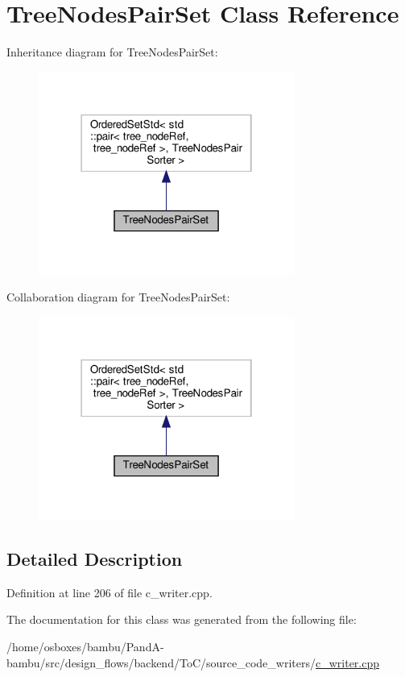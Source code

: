 \hypertarget{classTreeNodesPairSet}{}\section{Tree\+Nodes\+Pair\+Set Class Reference}
\label{classTreeNodesPairSet}


Inheritance diagram for Tree\+Nodes\+Pair\+Set\+:
\nopagebreak
\begin{figure}[H]
\begin{center}
\leavevmode
\includegraphics[width=238pt]{d7/df7/classTreeNodesPairSet__inherit__graph}
\end{center}
\end{figure}


Collaboration diagram for Tree\+Nodes\+Pair\+Set\+:
\nopagebreak
\begin{figure}[H]
\begin{center}
\leavevmode
\includegraphics[width=238pt]{d2/db3/classTreeNodesPairSet__coll__graph}
\end{center}
\end{figure}


\subsection{Detailed Description}


Definition at line 206 of file c\+\_\+writer.\+cpp.



The documentation for this class was generated from the following file\+:\begin{DoxyCompactItemize}
\item 
/home/osboxes/bambu/\+Pand\+A-\/bambu/src/design\+\_\+flows/backend/\+To\+C/source\+\_\+code\+\_\+writers/\hyperlink{c__writer_8cpp}{c\+\_\+writer.\+cpp}\end{DoxyCompactItemize}
